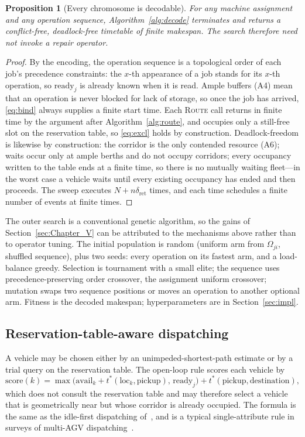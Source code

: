 \documentclass[manuscript,screen,review]{acmart}
\newtheorem{prop}{Proposition}
\begin{document}
\begin{prop}[Every chromosome is decodable]
  \label{prop:decodable}
  For any machine assignment and any operation sequence, Algorithm~\ref{alg:decode} terminates and returns a conflict-free, deadlock-free timetable of finite makespan. The search therefore need not invoke a repair operator.
\end{prop}

\begin{proof}
  By the encoding, the operation sequence is a topological order of each job's precedence constraints: the $x$-th appearance of a job stands for its $x$-th operation, so $\mathrm{ready}_j$ is already known when it is read.
  Ample buffers (A4) mean that an operation is never blocked for lack of storage, so once the job has arrived, \eqref{eq:bind} always supplies a finite start time.
  Each \textsc{Route} call returns in finite time by the argument after Algorithm~\ref{alg:route}, and occupies only a still-free slot on the reservation table, so \eqref{eq:excl} holds by construction.
  Deadlock-freedom is likewise by construction: the corridor is the only contended resource (A6); waits occur only at ample berths and do not occupy corridors; every occupancy written to the table ends at a finite time, so there is no mutually waiting fleet---in the worst case a vehicle waits until every existing occupancy has ended and then proceeds.
  The sweep executes $N+n\delta_{\mathrm{ret}}$ times, and each time schedules a finite number of events at finite times.
\end{proof}

The outer search is a conventional genetic algorithm, so the gains of Section~\ref{sec:Chapter_V} can be attributed to the mechanisms above rather than to operator tuning.
The initial population is random (uniform arm from $\Omega_{ji}$, shuffled sequence), plus two seeds: every operation on its fastest arm, and a load-balance greedy.
Selection is tournament with a small elite; the sequence uses precedence-preserving order crossover, the assignment uniform crossover; mutation swaps two sequence positions or moves an operation to another optional arm.
Fitness is the decoded makespan; hyperparameters are in Section~\ref{sec:impl}.

\subsection{Reservation-table-aware dispatching}
\label{sec:dispatch}

A vehicle may be chosen either by an unimpeded-shortest-path estimate or by a trial query on the reservation table.
The open-loop rule scores each vehicle by
\begin{equation}
\label{eq:rule}
\mathrm{score}(k)=\max\bigl(\mathrm{avail}_k+t^{*}(\mathrm{loc}_k,\text{pickup}),\,
\mathrm{ready}_j\bigr)+t^{*}(\text{pickup},\text{destination}),
\end{equation}
which does not consult the reservation table and may therefore select a vehicle that is geometrically near but whose corridor is already occupied.
The formula is the same as the idle-first dispatching of~\cite{li2026framework}, and is a typical single-attribute rule in surveys of multi-AGV dispatching~\cite{lu2022agv}.
\end{document}
